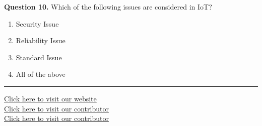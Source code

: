 \documentclass[11pt,a4paper]{article}
\begin{document}
\medskip\noindent\textbf{Question 10.} Which of the following issues are considered in IoT?
\begin{enumerate}[label=(\alph*),itemsep=2pt]
  \item Security Issue
  \item Reliability Issue
  \item Standard Issue
  \item All of the above
\end{enumerate}

\vfill
\rule{\linewidth}{0.4pt}
\begin{center}\small
\href{https://bhu-exam.vercel.app/}{Click here to visit our website}\\[4pt]\href{https://me-aryan.vercel.app/}{Click here to visit our contributor}\\[4pt]\href{https://quashan-me.vercel.app/}{Click here to visit our contributor}
\end{center}
\end{document}
